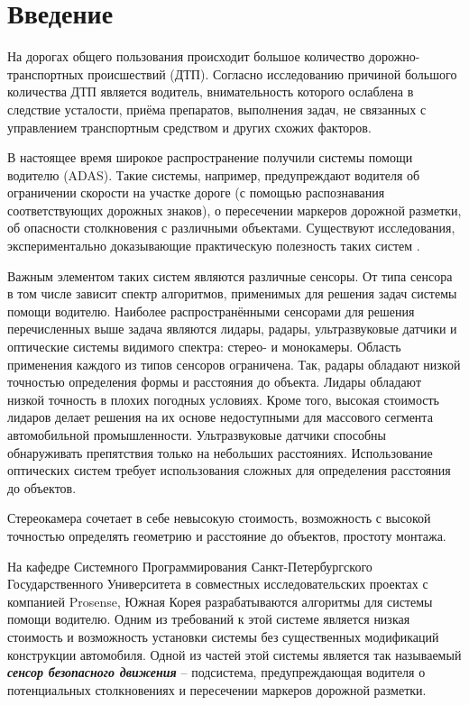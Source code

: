 \documentclass[aps,%
14pt,%
final,%
oneside,
onecolumn,%
musixtex, %
superscriptaddress,%
centertags]{extarticle} %
\begin{document}
\tableofcontents

\setcounter{page}{3}

\newpage

\section*{Введение}

На дорогах общего пользования происходит большое количество дорожно-транспортных происшествий (ДТП). Согласно исследованию \cite{staubach2009factors} причиной большого количества ДТП является водитель, внимательность которого ослаблена в следствие усталости, приёма препаратов, выполнения задач, не связанных с управлением транспортным средством и других схожих факторов.

В настоящее время широкое распространение получили системы помощи водителю (ADAS). Такие системы, например, предупреждают водителя об ограничении скорости на участке дороге (с помощью распознавания соответствующих дорожных знаков), о пересечении маркеров дорожной разметки, об опасности столкновения с различными объектами. Существуют исследования, экспериментально доказывающие практическую полезность таких систем \cite{maag2012studying}.

Важным элементом таких систем являются различные сенсоры. От типа сенсора в том числе зависит спектр алгоритмов, применимых для решения задач системы помощи водителю. Наиболее распространёнными сенсорами для решения перечисленных выше задача являются лидары, радары, ультразвуковые датчики и оптические системы видимого спектра: стерео- и монокамеры. Область применения каждого из типов сенсоров ограничена. Так, радары обладают низкой точностью определения формы и расстояния до объекта. Лидары обладают низкой точность в плохих погодных условиях. Кроме того, высокая стоимость лидаров делает решения на их основе недоступными для массового сегмента автомобильной промышленности. Ультразвуковые датчики способны обнаруживать препятствия только на небольших расстояниях. Использование оптических систем требует использования сложных для определения расстояния до объектов. 

Стереокамера сочетает в себе невысокую стоимость, возможность с высокой точностью определять геометрию и расстояние до объектов, простоту монтажа.


На кафедре Системного Программирования Санкт-Петербургского Государственного Университета в совместных исследовательских проектах с компанией Prosense, Южная Корея разрабатываются алгоритмы для системы помощи водителю. Одним из требований к этой системе является низкая стоимость и возможность установки системы без существенных модификаций конструкции автомобиля. Одной из частей этой системы является так называемый \textit{\textbf{сенсор безопасного движения}} -- подсистема, предупреждающая водителя о потенциальных столкновениях и пересечении маркеров дорожной разметки.
\end{document}

